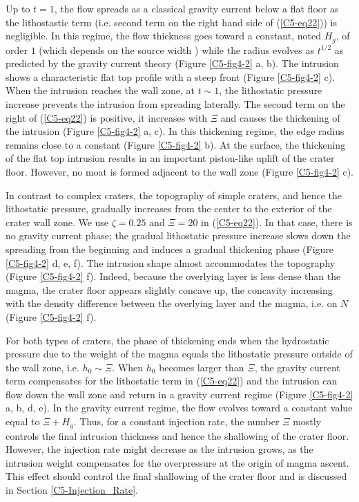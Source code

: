 Up to $t=1$,  the flow spreads as a classical  gravity current below a
flat floor  as the lithostastic term  (i.e.  second term on  the right
hand side of (\ref{C5-eq22})) is  negligible. In this regime, the flow
thickness goes  toward a  constant, noted $H_g$,  of order  $1$ (which
depends on  the source width \citep{Michaut:2009jx})  while the radius
evolves  as  $t^{1/2}$ as  predicted  by  the gravity  current  theory
\citep{Huppert:1982a}  (Figure \ref{C5-fig4-2}  a, b).   The intrusion
shows a  characteristic flat  top profile with  a steep  front (Figure
\ref{C5-fig4-2}  c).  When  the intrusion  reaches the  wall zone,  at
$t\sim1$,  the lithostatic  pressure increase  prevents the  intrusion
from  spreading   laterally.   The  second   term  on  the   right  of
(\ref{C5-eq22}) is  positive, it increases  with $\Xi$ and  causes the
thickening of  the intrusion (Figure  \ref{C5-fig4-2} a, c).   In this
thickening regime, the edge radius remains close to a constant (Figure
\ref{C5-fig4-2} b).   At the surface,  the thickening of the  flat top
intrusion results  in an  important piston-like  uplift of  the crater
floor. However,  no moat is formed  adjacent to the wall  zone (Figure
\ref{C5-fig4-2} c).
		 
In contrast to complex craters,  the topography of simple craters, and
hence the lithostatic pressure, gradually increases from the center to
the  exterior  of the  crater  wall  zone.   We use  $\zeta=0.25$  and
$\Xi=20$ in (\ref{C5-eq22}). In that case, there is no gravity current
phase;  the  gradual  lithostatic  pressure increase  slows  down  the
spreading from  the beginning and  induces a gradual  thickening phase
(Figure  \ref{C5-fig4-2}  d,  e,   f).   The  intrusion  shape  almost
accommodates  the  topography  (Figure  \ref{C5-fig4-2}  f).   Indeed,
because the overlying  layer is less dense than the  magma, the crater
floor appears slightly  concave up, the concavity  increasing with the
density difference between the overlying  layer and the magma, i.e. on
$N$ (Figure \ref{C5-fig4-2} f).

For  both types  of craters,  the phase  of thickening  ends when  the
hydrostatic  pressure  due to  the  weight  of  the magma  equals  the
lithostatic pressure outside of the wall zone, i.e.  $h_{0} \sim \Xi$.
When  $h_{0} $  becomes larger  than $\Xi$,  the gravity  current term
compensates  for  the  lithostatic  term in  (\ref{C5-eq22})  and  the
intrusion can flow down the wall  zone and return in a gravity current
regime (Figure  \ref{C5-fig4-2} a, b,  d, e).  In the  gravity current
regime, the flow evolves toward a constant value equal to $\Xi + H_g$.
Thus, for a constant injection  rate, the number $\Xi$ mostly controls
the final intrusion  thickness and hence the shallowing  of the crater
floor.  However,  the injection rate  might decrease as  the intrusion
grows, as the intrusion weight compensates for the overpressure at the
origin  of  magma  ascent.   This  effect  should  control  the  final
shallowing  of   the  crater  floor   and  is  discussed   in  Section
\ref{C5-Injection_Rate}.
	
